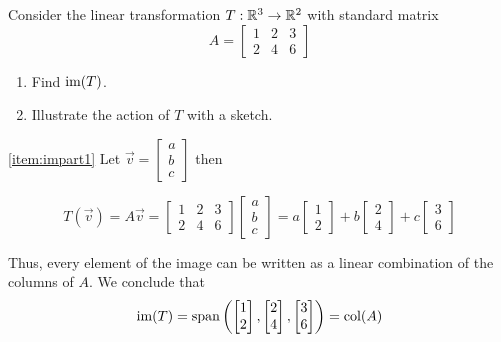 \documentclass{ximera}
\begin{document}
\begin{example}\label{ex:image1}
Consider the linear transformation $T:\mathbb{R}^3\rightarrow \mathbb{R}^2$ with standard matrix
$$A=\begin{bmatrix}1&2&3\\2&4&6\end{bmatrix}$$

\begin{enumerate}
\item\label{item:impart1}
Find $\textnormal{im}(T)$.
\item\label{item:impart2}
Illustrate the action of $T$ with a sketch.

\end{enumerate}
\begin{explanation}

\ref{item:impart1} Let $\vec{v}=\begin{bmatrix}a\\b\\c\end{bmatrix}$ then

$$T(\vec{v})=A\vec{v}=\begin{bmatrix}1&2&3\\2&4&6\end{bmatrix}\begin{bmatrix}a\\b\\c\end{bmatrix}=a\begin{bmatrix}1\\2\end{bmatrix}+b\begin{bmatrix}2\\4\end{bmatrix}+c\begin{bmatrix}3\\6\end{bmatrix}$$

Thus, every element of the image can be written as a linear combination of the columns of $A$.  We conclude that 
$$\textnormal{im}(T)=\textnormal{span}\left(\begin{bmatrix}1\\2\end{bmatrix}, \begin{bmatrix}2\\4\end{bmatrix}, \begin{bmatrix}3\\6\end{bmatrix}\right)=\textnormal{col}(A)$$


\end{explanation}
\end{example}
\end{document}
